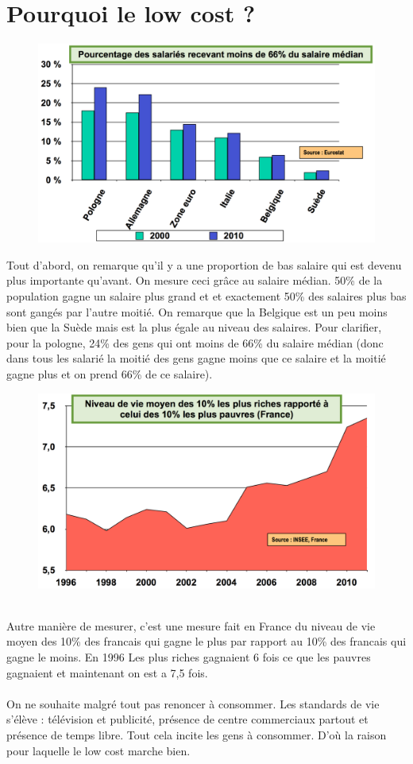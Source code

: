 \section{Pourquoi le low cost ?}
\begin{figure}
	\includegraphics[scale=0.3]{64}
\end{figure}
\noindent Tout d'abord, on remarque qu'il y a une proportion de bas salaire qui est devenu plus importante qu’avant. On mesure ceci grâce au salaire médian. 50\% de la population gagne un salaire plus grand et et exactement 50\% des salaires plus bas sont gangés par l'autre moitié. On remarque que la Belgique est un peu moins bien que la Suède mais est la plus égale au niveau des salaires. Pour clarifier, pour la pologne, 24\% des gens qui ont moins de 66\% du salaire médian (donc dans tous les salarié la moitié des gens gagne moins que ce salaire et la moitié gagne plus et on prend 66\% de ce salaire).

\begin{figure}
	\includegraphics[scale=0.3]{65}
\end{figure}
\ \\
Autre manière de mesurer, c’est une mesure fait en France du niveau de vie moyen des 10\% des francais qui gagne le plus par rapport au 10\% des francais qui gagne le moins. En 1996 Les plus riches gagnaient 6 fois ce que les pauvres gagnaient et maintenant on est a 7,5 fois.\\\\
On ne souhaite malgré tout pas renoncer à consommer. Les standards de vie s’élève : télévision et publicité, présence de centre commerciaux partout et présence de temps libre. Tout cela incite les gens à consommer. D'où la raison pour laquelle le low cost marche bien.

